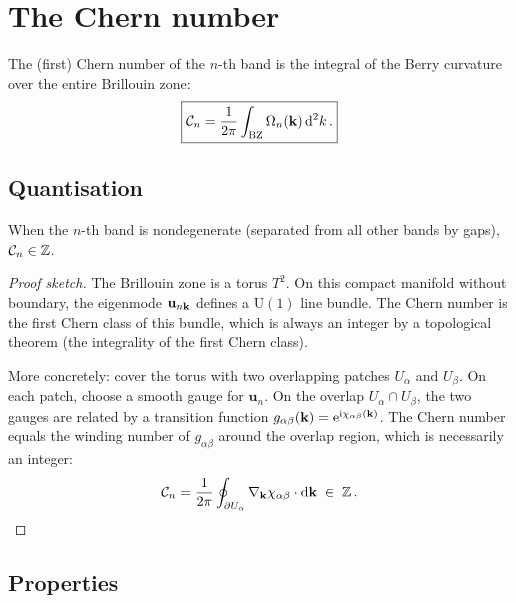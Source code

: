 \section{The Chern number}
\label{sec:ch5-chern}

\begin{definition}
  \label{def:ch5-chern}
  The (first) Chern number of the $n$-th band is the integral of the
  Berry curvature over the entire Brillouin zone:
  \begin{equation}\label{eq:ch5-chern}
    \boxed{%
    \Chern_n = \frac{1}{2\pi}\int_\BZ \Omega_n(\kvec)\,\dd^2 k\,.}
  \end{equation}
\end{definition}

\subsection{Quantisation}
\label{sec:ch5-quantisation}

\begin{theorem}
  \label{thm:ch5-chern-integer}
  When the $n$-th band is nondegenerate (separated from all other bands
  by gaps), $\mathcal{C}_n\in\mathbb{Z}$.
\end{theorem}

\begin{proof}[Proof sketch]
The Brillouin zone is a torus $T^2$.  On this compact manifold without
boundary, the eigenmode $\mathbf{u}_{n\mathbf{k}}$ defines a $\mathrm{U}(1)$
line bundle.  The Chern number is the first Chern class of this bundle,
which is always an integer by a topological theorem (the integrality of
the first Chern class).

More concretely: cover the torus with two overlapping patches $U_\alpha$
and $U_\beta$.  On each patch, choose a smooth gauge for
$\mathbf{u}_n$.  On the overlap $U_\alpha\cap U_\beta$, the two gauges
are related by a transition function
$g_{\alpha\beta}(\mathbf{k})=\mathrm{e}^{\mathrm{i}\chi_{\alpha\beta}(\mathbf{k})}$.  The
Chern number equals the winding number of $g_{\alpha\beta}$ around the
overlap region, which is necessarily an integer:
\begin{equation}
  \mathcal{C}_n = \frac{1}{2\pi}\oint_{\partial U_\alpha}
  \nabla_{\mathbf{k}}\chi_{\alpha\beta}\cdot\mathrm{d}\mathbf{k} \;\in\;\mathbb{Z}\,.
\end{equation}
\end{proof}

\subsection{Properties}
\label{sec:ch5-chern-properties}

